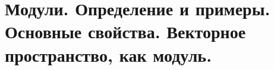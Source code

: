 \section{
    Модули. Определение и примеры. Основные свойства. Векторное пространство, как модуль. 
 }



